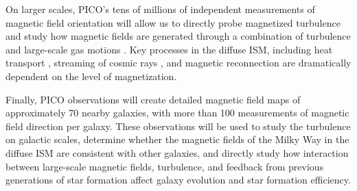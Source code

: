 \documentclass[PICOReport.tex]{subfiles}
\begin{document}
On larger scales, PICO's tens of millions of independent measurements of magnetic field orientation will allow us to directly probe magnetized turbulence and study how magnetic fields are generated through a combination of turbulence and large-scale gas motions \citep{Xu_2018}.   Key processes in the diffuse ISM, including heat transport \citep{Lazarian:2006}, streaming of cosmic rays \citep{Lazarian:2016}, and magnetic reconnection \citep{Lazarian_Vishniac:1999} are dramatically dependent on the level of magnetization.

Finally, PICO observations will create detailed magnetic field maps of approximately 70 nearby galaxies, with more than 100 measurements of magnetic field direction per galaxy.  These observations will be used to study the turbulence on galactic scales, determine whether the magnetic fields of the Milky Way in the diffuse ISM are consistent with other galaxies, and directly study how interaction between large-scale magnetic fields, turbulence, and feedback from previous generations of star formation affect galaxy evolution and star formation efficiency.

%
%
\end{document}
